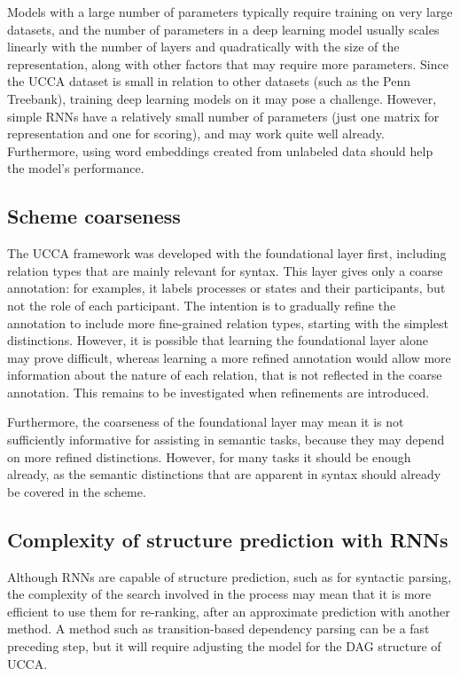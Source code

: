 \documentclass[11pt]{article}
\begin{document}
Models with a large number of parameters typically require training on very
large datasets, and the number of parameters in a deep learning model usually
scales linearly with the number of layers and quadratically with the size of
the representation, along with other factors that may require more parameters.
Since the UCCA dataset is small in relation to other datasets (such as the Penn
Treebank), training deep learning models on it may pose a challenge. However,
simple RNNs have a relatively small number of parameters (just one matrix for
representation and one for scoring), and may work quite well
already\cite{socher2010learning}. Furthermore, using word embeddings created
from unlabeled data should help the model's
performance\cite{collobert2008unified}.


\subsection{Scheme coarseness}

The UCCA framework was developed with the foundational layer first, including
relation types that are mainly relevant for syntax. This layer gives only a
coarse annotation: for examples, it labels processes or states and their
participants, but not the role of each participant. The intention is to
gradually refine the annotation to include more fine-grained relation types,
starting with the simplest distinctions. However, it is possible that learning
the foundational layer alone may prove difficult, whereas learning a more
refined annotation would allow more information about the nature of each
relation, that is not reflected in the coarse annotation. This remains to be
investigated when refinements are introduced.

Furthermore, the coarseness of the foundational layer may mean it is not
sufficiently informative for assisting in semantic tasks, because they may
depend on more refined distinctions. However, for many tasks it should be
enough already, as the semantic distinctions that are apparent in syntax should
already be covered in the scheme.


\subsection{Complexity of structure prediction with RNNs}

Although RNNs are capable of structure prediction, such as for syntactic
parsing\cite{socher2010learning}, the complexity of the search involved in the
process may mean that it is more efficient to use them for re-ranking, after an
approximate prediction with another
method\cite{socher2013parsing}\cite{le2014inside}. A method such as
transition-based dependency parsing can be a fast preceding
step\cite{chen2014fast}, but it will require adjusting the model for the DAG
structure of UCCA.
\end{document}
